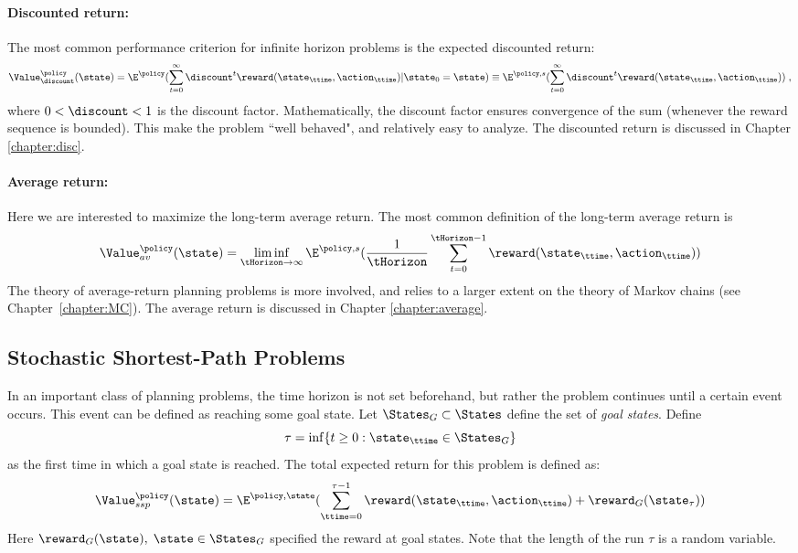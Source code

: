 \paragraph{Discounted return:} The most common performance criterion for infinite horizon problems is the expected discounted return:
\[\Value_\discount ^\policy (\state) = {\E^\policy }(\sum\limits_{t = 0}^\infty  {{\discount ^t}\reward({\state_\ttime},{\action_\ttime})} |{\state_0} = \state) \equiv {\E^{\policy ,s}}(\sum\limits_{t = 0}^\infty  {{\discount ^t}\reward({\state_\ttime},{\action_\ttime})} )\;,\]
where $0 < \discount  < 1$ is the discount factor. Mathematically,
the discount factor ensures convergence of the sum (whenever the
reward sequence is bounded). This make the problem ``well behaved",
and relatively easy to analyze. The discounted return is discussed
in Chapter \ref{chapter:disc}.

\paragraph{Average return:}  Here we are interested to maximize the long-term average return. The most common definition of the long-term average return is
\[\Value_{av}^\policy (\state) = \mathop {\lim \inf }\limits_{\tHorizon \to \infty } {\E^{\policy ,s}}(\frac{1}{\tHorizon}\sum\limits_{t = 0}^{\tHorizon -1} {\reward({\state_\ttime},{\action_\ttime})} )\]
The theory of average-return planning problems is more involved, and
relies to a larger extent on the theory of Markov chains (see
Chapter~\ref{chapter:MC}). The average return is discussed in
Chapter \ref{chapter:average}.



\subsection{Stochastic Shortest-Path Problems}
In an important class of planning problems, the time horizon is not
set beforehand, but rather the problem continues until a certain
event occurs. This event can be defined as reaching some goal state.
Let  ${\States_G} \subset \States$ define the set of \emph{goal
states}. Define
\[\tau  = \inf \{ t \ge 0:{\state_\ttime} \in {\States_G}\} \]
as the first time in which a goal state is reached. The total expected return for this problem is defined as:
\[\Value_{ssp}^\policy (\state) = {\E^{\policy ,\state}}(\sum\limits_{\ttime = 0}^{\tau  - 1} {\reward({\state_\ttime},{\action_\ttime})}  + {\reward_G}({\state_\tau }))\]
Here ${\reward_G}(\state),\;\state \in {\States_G}$ specified the
reward at goal states. Note that the length of the run $\tau$ is a random variable.




